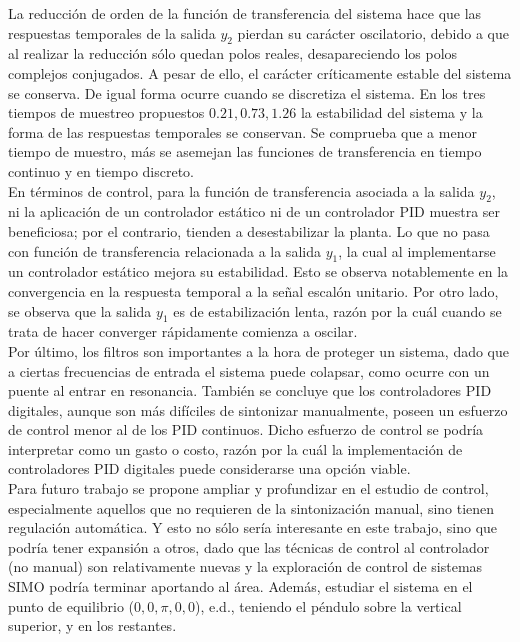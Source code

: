 \documentclass[journal]{IEEEtran}
\begin{document}
La reducción de orden de la función de transferencia del sistema hace que las respuestas temporales de la salida $y_2$ pierdan su carácter oscilatorio, debido a que al realizar la reducción sólo quedan polos reales, desapareciendo los polos complejos conjugados. A pesar de ello, el carácter críticamente estable del sistema se conserva. De igual forma ocurre cuando se discretiza el sistema. En los tres tiempos de muestreo propuestos $0.21, 0.73,1.26$ la estabilidad del sistema y la forma de las respuestas temporales se conservan. Se comprueba que a menor tiempo de muestro, más se asemejan las funciones de transferencia en tiempo continuo y en tiempo discreto.\\

En términos de control, para la función de transferencia asociada a la salida $y_2$, ni la aplicación de un controlador estático ni de un controlador PID muestra ser beneficiosa; por el contrario, tienden a desestabilizar la planta. Lo que no pasa con función de transferencia relacionada a la salida $y_1$, la cual al implementarse un controlador estático mejora su estabilidad. Esto se observa notablemente en la convergencia en la respuesta temporal a la señal escalón unitario. Por otro lado, se observa que la salida $y_1$ es de estabilización lenta, razón por la cuál cuando se trata de hacer converger rápidamente comienza a oscilar.\\

Por último, los filtros son importantes a la hora de proteger un sistema, dado que a ciertas frecuencias de entrada el sistema puede colapsar, como ocurre con un puente al entrar en resonancia. También se concluye que los controladores PID digitales, aunque son más difíciles de sintonizar manualmente, poseen un esfuerzo de control menor al de los PID continuos. Dicho esfuerzo de control se podría interpretar como un gasto o costo, razón por la cuál la implementación de controladores PID digitales puede considerarse una opción viable.\\

Para futuro trabajo se propone ampliar y profundizar en el estudio de control, especialmente aquellos que no requieren de la sintonización manual, sino tienen regulación automática. Y esto no sólo sería interesante en este trabajo, sino que podría tener expansión a otros, dado que las técnicas de control al controlador (no manual) son relativamente nuevas y la exploración de control de sistemas SIMO podría terminar aportando al área. Además, estudiar el sistema en el punto de equilibrio ($0,0,\pi,0,0$), e.d., teniendo el péndulo sobre la vertical superior, y en los restantes. 




\newpage

\end{document}
